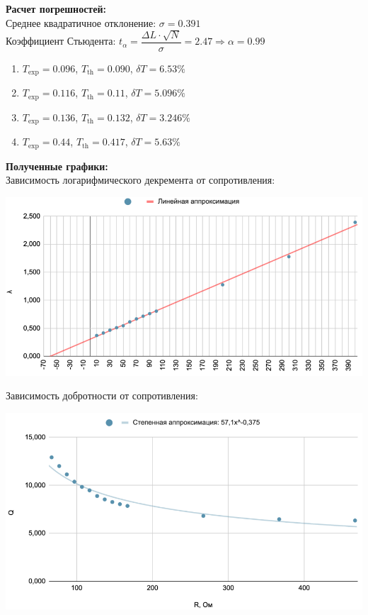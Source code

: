 \documentclass[12pt,a4paper]{report}
\begin{document}
\hfill\break
\hfill\break
\textbf{Расчет погрешностей:} \\
\hfill\break
Среднее квадратичное отклонение: $\sigma=0.391$ \\
Коэффициент Стьюдента: $t_\alpha=\dfrac{\Delta L\cdot\sqrt{N}}{\sigma}=2.47\Rightarrow \alpha=0.99$
\begin{enumerate}
    \item $T_\text{exp}=0.096$, $T_\text{th}=0.090$, $\delta T=6.53\%$
    \item $T_\text{exp}=0.116$, $T_\text{th}=0.11$, $\delta T=5.096\%$
    \item $T_\text{exp}=0.136$, $T_\text{th}=0.132$, $\delta T=3.246\%$
    \item $T_\text{exp}=0.44$, $T_\text{th}=0.417$, $\delta T=5.63\%$
\end{enumerate}
\hfill\break
\textbf{Полученные графики:} \\
\hfill\break
Зависимость логарифмического декремента от сопротивления: \\
\begin{center}
    \includegraphics[width=\textwidth]{graph1.png}
\end{center}
\newpage\noindent
Зависимость добротности от сопротивления: \\
\begin{center}
    \includegraphics[width=\textwidth]{graph2.png}
\end{center}
\end{document}

